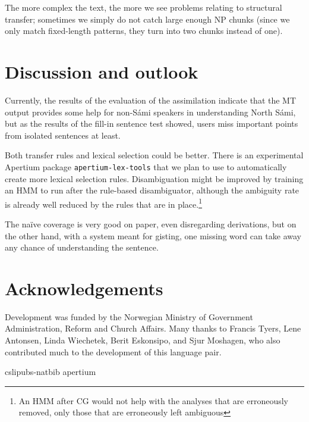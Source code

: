 \documentclass{book}
\begin{document}
The more complex the text, the more we see problems relating to
structural transfer; sometimes we simply do not catch large enough NP
chunks (since we only match fixed-length patterns, they turn into two
chunks instead of one).


\section{Discussion and outlook}
Currently, the results of the evaluation of the assimilation indicate
that the MT output provides some help for non-S\'{a}mi speakers in
understanding North S\'{a}mi, but as the results of the fill-in sentence
test showed, users miss important points from isolated sentences at
least.

Both transfer rules and lexical selection could be better. There is an
experimental Apertium package \texttt{apertium-lex-tools} that we plan
to use to automatically create more lexical selection rules.
Disambiguation might be improved by training an HMM to run after the
rule-based disambiguator, although the ambiguity rate is already well
reduced by the rules that are in place.\footnote{An HMM after CG would
  not help with the analyses that are erroneously removed, only those
  that are erroneously left ambiguous}

The na\"{i}ve coverage is very good on paper, even disregarding
derivations, but on the other hand, with a system meant for gisting,
one missing word can take away any chance of understanding the
sentence.

\section*{Acknowledgements}
Development was funded by the Norwegian Ministry of Government
Administration, Reform and Church Affairs. Many thanks to Francis
Tyers, Lene Antonsen, Linda Wiechetek, Berit Eskonsipo, and Sjur
Moshagen, who also contributed much to the development of this
language pair.                  %



 {cslipubs-natbib}
 {apertium}


\backmatter
\end{document}

